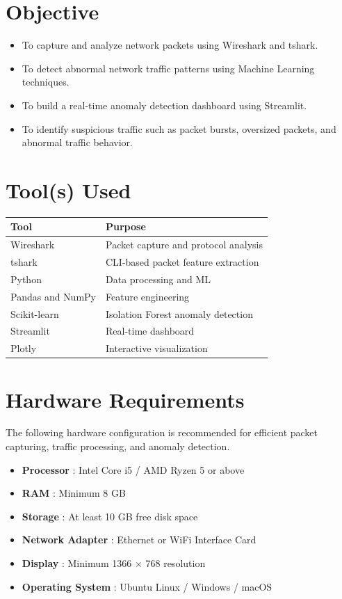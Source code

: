 \documentclass[12pt,a4paper]{article}
\begin{document}
	\section{Objective}
	
	\begin{itemize}
		\item To capture and analyze network packets using Wireshark and tshark.
		\item To detect abnormal network traffic patterns using Machine Learning techniques.
		\item To build a real-time anomaly detection dashboard using Streamlit.
		\item To identify suspicious traffic such as packet bursts, oversized packets, and abnormal traffic behavior.
	\end{itemize}
	
	\section{Tool(s) Used}
	
	\begin{longtable}{|p{5cm}|p{8cm}|}
		\hline
		\textbf{Tool} & \textbf{Purpose} \\ \hline
		Wireshark & Packet capture and protocol analysis \\ \hline
		tshark & CLI-based packet feature extraction \\ \hline
		Python & Data processing and ML \\ \hline
		Pandas and NumPy & Feature engineering \\ \hline
		Scikit-learn & Isolation Forest anomaly detection \\ \hline
		Streamlit & Real-time dashboard \\ \hline
		Plotly & Interactive visualization \\ \hline
	\end{longtable}
	
	\section{Hardware Requirements}
	
	The following hardware configuration is recommended for efficient packet capturing, traffic processing, and anomaly detection.
	
	\begin{itemize}
		\item \textbf{Processor} : Intel Core i5 / AMD Ryzen 5 or above
		\item \textbf{RAM} : Minimum 8 GB
		\item \textbf{Storage} : At least 10 GB free disk space
		\item \textbf{Network Adapter} : Ethernet or WiFi Interface Card
		\item \textbf{Display} : Minimum 1366 $\times$ 768 resolution
		\item \textbf{Operating System} : Ubuntu Linux / Windows / macOS
	\end{itemize}
	
\end{document}
